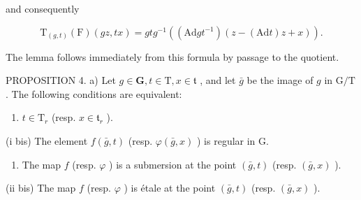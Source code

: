 and consequently

\[
\mathrm{T} _ {(g, t)} (\mathrm{F}) (g z, t x) = g t g ^ {- 1} ((\mathrm{Ad}   g t ^ {- 1}) (z - (\mathrm{Ad}   t) z + x)).
\]

The lemma follows immediately from this formula by passage to the quotient.

PROPOSITION 4. a) Let \(g \in \mathbf{G}, t \in \mathrm{T}, x \in \mathfrak{t}\) , and let \(\bar{g}\) be the image of \(g\) in \(\mathrm{G} / \mathrm{T}\) . The following conditions are equivalent:

\begin{enumerate}
\def\labelenumi{(\roman{enumi})}
\tightlist
\item
  \(t \in \mathrm{T}_r\) (resp. \(x \in \mathfrak{t}_r\) ).
\end{enumerate}

(i bis) The element \(f(\bar{g}, t)\) (resp. \(\varphi(\bar{g}, x)\) ) is regular in G.

\begin{enumerate}
\def\labelenumi{(\roman{enumi})}
\setcounter{enumi}{1}
\tightlist
\item
  The map \(f\) (resp. \(\varphi\) ) is a submersion at the point \((\bar{g}, t)\) (resp. \((\bar{g}, x)\) ).
\end{enumerate}

(ii bis) The map \(f\) (resp. \(\varphi\) ) is étale at the point \((\bar{g}, t)\) (resp. \((\bar{g}, x)\) ).

